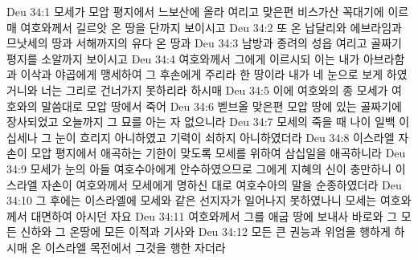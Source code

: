 Deu 34:1  모세가 모압 평지에서 느보산에 올라 여리고 맞은편 비스가산 꼭대기에 이르매 여호와께서 길르앗 온 땅을 단까지 보이시고
Deu 34:2  또 온 납달리와 에브라임과 므낫세의 땅과 서해까지의 유다 온 땅과
Deu 34:3  남방과 종려의 성읍 여리고 골짜기 평지를 소알까지 보이시고
Deu 34:4  여호와께서 그에게 이르시되 이는 내가 아브라함과 이삭과 야곱에게 맹세하여 그 후손에게 주리라 한 땅이라 내가 네 눈으로 보게 하였거니와 너는 그리로 건너가지 못하리라 하시매
Deu 34:5  이에 여호와의 종 모세가 여호와의 말씀대로 모압 땅에서 죽어
Deu 34:6  벧브올 맞은편 모압 땅에 있는 골짜기에 장사되었고 오늘까지 그 묘를 아는 자 없으니라
Deu 34:7  모세의 죽을 때 나이 일백 이십세나 그 눈이 흐리지 아니하였고 기력이 쇠하지 아니하였더라
Deu 34:8  이스라엘 자손이 모압 평지에서 애곡하는 기한이 맞도록 모세를 위하여 삼십일을 애곡하니라
Deu 34:9  모세가 눈의 아들 여호수아에게 안수하였으므로 그에게 지혜의 신이 충만하니 이스라엘 자손이 여호와께서 모세에게 명하신 대로 여호수아의 말을 순종하였더라
Deu 34:10  그 후에는 이스라엘에 모세와 같은 선지자가 일어나지 못하였나니 모세는 여호와께서 대면하여 아시던 자요
Deu 34:11  여호와께서 그를 애굽 땅에 보내사 바로와 그 모든 신하와 그 온땅에 모든 이적과 기사와
Deu 34:12  모든 큰 권능과 위엄을 행하게 하시매 온 이스라엘 목전에서 그것을 행한 자더라



